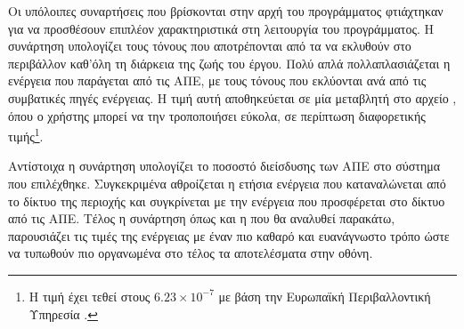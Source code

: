 \documentclass[12pt]{report}
\begin{document}
{}

Οι υπόλοιπες συναρτήσεις που βρίσκονται στην αρχή του προγράμματος φτιάχτηκαν για να προσθέσουν επιπλέον χαρακτηριστικά στη λειτουργία του προγράμματος. Η συνάρτηση {\textbf{{}}} υπολογίζει τους τόνους
{} που αποτρέπονται από τα να εκλυθούν στο περιβάλλον καθ'όλη τη διάρκεια της ζωής του έργου. Πολύ απλά πολλαπλασιάζεται η ενέργεια που παράγεται από τις ΑΠΕ, με τους τόνους {} που εκλύονται
ανά {} από τις συμβατικές πηγές ενέργειας. Η τιμή αυτή αποθηκεύεται σε μία μεταβλητή στο αρχείο {}, όπου ο χρήστης μπορεί να την τροποποιήσει εύκολα, σε περίπτωση διαφορετικής τιμής\footnote{
Η τιμή έχει τεθεί στους \(6.23\times10^{-7}\) {} με βάση την Ευρωπαϊκή Περιβαλλοντική Υπηρεσία {} .}.  

Αντίστοιχα η συνάρτηση {\textbf{{}}} υπολογίζει το ποσοστό διείσδυσης των ΑΠΕ στο σύστημα που επιλέχθηκε. Συγκεκριμένα αθροίζεται η ετήσια ενέργεια που καταναλώνεται από το δίκτυο της περιοχής
και συγκρίνεται με την ενέργεια που προσφέρεται στο δίκτυο από τις ΑΠΕ. Τέλος η συνάρτηση {\textbf{{}}} όπως και η {\textbf{{}}} που θα αναλυθεί παρακάτω, παρουσιάζει τις τιμές της ενέργειας
με έναν πιο καθαρό και ευανάγνωστο τρόπο ώστε να τυπωθούν πιο οργανωμένα στο τέλος τα αποτελέσματα στην οθόνη.

{}
\end{document}
